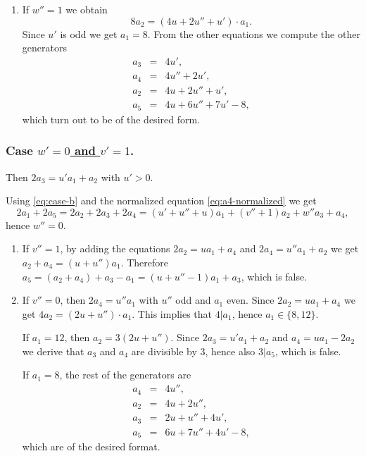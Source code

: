 \documentclass[12pt]{amsart}
\begin{document}
\begin{enumerate}[leftmargin=0.5cm,label*=\arabic*.]
\begin{enumerate}[leftmargin=0.5cm, label*=\arabic*.]
					None of these situations may hold. 
				\item If \underline{$w''=1$} we obtain 
					$$
						8 a_2= (4u+2u''+u') \cdot a_1.
					$$
					Since $u'$ is odd we get $a_1=8$. From the other equations we compute the   other generators 
					 \begin{eqnarray}
						\label{eq:sol4}
							a_3 &=& 4u', \nonumber\\
							a_4 &=& 4u''+2u', \nonumber \\
							a_2 &=& 4u+ 2u''+u', \\
							a_5 &=& 4u+6u''+7u'-8,  \nonumber
					 \end{eqnarray}
					which turn out to be of the desired form.
			\end{enumerate}
	\end{enumerate}
\subsubsection{Case \underline{$w'= 0$ and $v'=1$}.} 
Then $2 a_3= u'a_1+a_2$ with $u'>0$. 

Using \eqref{eq:case-b} and the normalized equation \eqref{eq:a4-normalized} we get 
$$
  2a_1+ 2a_5= 2 a_2+ 2a_3+ 2a_4=(u'+u''+u)a_1+ (v''+1) a_2+ w'' a_3+ a_4,
$$ 
hence $w''=0$. 
		\begin{enumerate}[leftmargin=0.5cm,label*=\arabic*.]
			\item If \underline{$v''=1$}, by adding the equations $2a_2=u a_1+ a_4$ and $2a_4= u'' a_1+ a_2$ we get $a_2+a_4=(u+u'')a_1$.
				Therefore $a_5=(a_2+a_4)+ a_3-a_1= (u+u''-1) a_1+a_3$, which is false.
			\item If \underline{$v''=0$}, then $2a_4=u'' a_1$ with $u''$ odd and $a_1$ even. 
			Since $2a_2=u a_1+ a_4$ we get   $4 a_2= (2u+ u'')\cdot a_1$. This   implies that $4|a_1$, hence $a_1\in \{8,12\}$. 
			
			If \underline{$a_1=12$}, then $a_2=3(2u+u'')$. Since  $2 a_3=u' a_1+ a_2$ and $a_4= ua_1-2a_2$ we derive that $a_3$ and $a_4$ are divisible by $3$, 
			   hence also $3|a_5$, which is false.
				
			If \underline{$a_1=8$}, the rest of the generators are 
				\begin{eqnarray}
					\label{eq:sol5}
					a_4 &=& 4u'', \nonumber \\
					a_2 &=& 4u+2u'', \nonumber \\
					a_3 &=& 2u+u''+4u', \\
					a_5 &=& 6u+7u''+4u'-8, \nonumber
				\end{eqnarray}
			which are of the desired format.	
		\end{enumerate}
\end{document}
